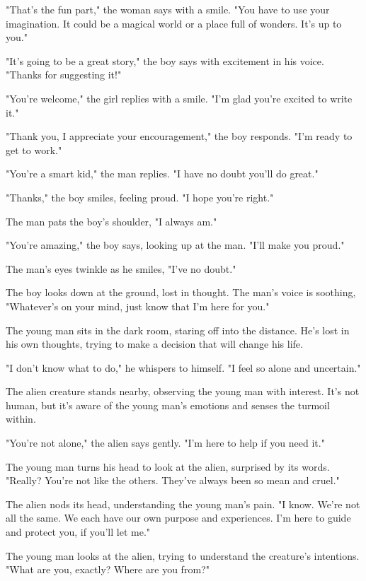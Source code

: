 \documentclass[smalldemyvopaper,11pt,twoside,onecolumn,openright,extrafontsizes]{memoir}
\begin{document}
"That's the fun part," the woman says with a smile. "You have to use your imagination. It could be a magical world or a place full of wonders. It's up to you."\par
"It's going to be a great story," the boy says with excitement in his voice. "Thanks for suggesting it!"\par
"You're welcome," the girl replies with a smile. "I'm glad you're excited to write it."\par
"Thank you, I appreciate your encouragement," the boy responds. "I'm ready to get to work."\par
"You're a smart kid," the man replies. "I have no doubt you'll do great."\par
"Thanks," the boy smiles, feeling proud. "I hope you're right."\par
The man pats the boy's shoulder, "I always am."\par
"You're amazing," the boy says, looking up at the man. "I'll make you proud."\par
The man's eyes twinkle as he smiles, "I've no doubt."\par
The boy looks down at the ground, lost in thought. The man's voice is soothing, "Whatever's on your mind, just know that I'm here for you."\par
The young man sits in the dark room, staring off into the distance. He's lost in his own thoughts, trying to make a decision that will change his life.\par
"I don't know what to do," he whispers to himself. "I feel so alone and uncertain."\par
The alien creature stands nearby, observing the young man with interest. It's not human, but it's aware of the young man's emotions and senses the turmoil within.\par
"You're not alone," the alien says gently. "I'm here to help if you need it."\par
The young man turns his head to look at the alien, surprised by its words. "Really? You're not like the others. They've always been so mean and cruel."\par
The alien nods its head, understanding the young man's pain. "I know. We're not all the same. We each have our own purpose and experiences. I'm here to guide and protect you, if you'll let me."\par
The young man looks at the alien, trying to understand the creature's intentions. "What are you, exactly? Where are you from?"\par
\end{document}
